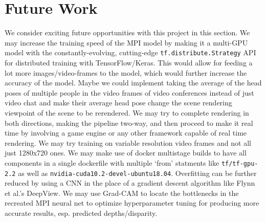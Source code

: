 \section{Future Work}\label{sec:future-work}

We consider exciting future opportunities with this project in this section. We may increase the training speed of the MPI model by making it a multi-GPU model with the constantly-evolving, cutting-edge \texttt{tf.distribute.Strategy} API for distributed training with TensorFlow/Keras. This would allow for feeding a lot more images/video-frames to the model, which would further increase the accuracy of the model. Maybe we could implement taking the average of the head poses of multiple people in the video frames of video conferences instead of just video chat and make their average head pose change the scene rendering viewpoint of the scene to be rerendered. We may try to complete rendering in both directions, making the pipeline two-way, and then proceed to make it real time by involving a game engine or any other framework capable of real time rendering. We may try training on variable resolution video frames and not all just 1280x720 ones. We may make use of docker multistage builds to have all components in a single dockerfile with multiple `from' statments like \texttt{tf/tf-gpu-2.2} as well as \texttt{nvidia-cuda10.2-devel-ubuntu18.04}. Overfitting can be further reduced by using a CNN in the place of a gradient descent algorithm like Flynn et al.'s DeepView. We may use Grad-CAM to locate the bottlenecks in the recreated MPI neural net to optimize hyperparameter tuning for producing more accurate results, esp. predicted depths/disparity.












